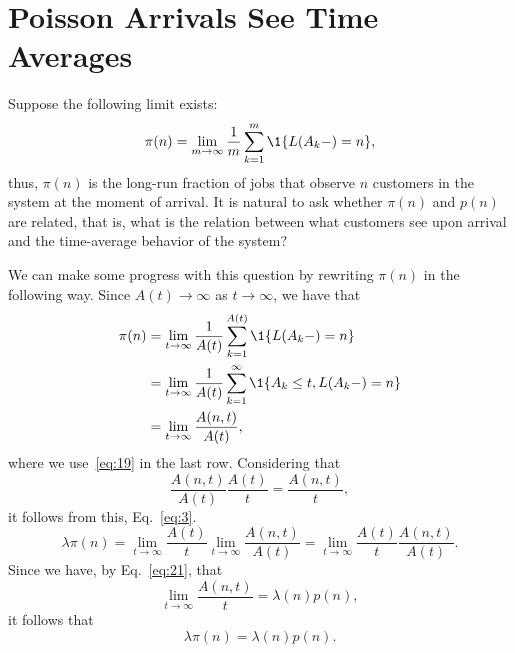 \section{Poisson Arrivals See Time Averages}
\label{sec:poisson-arrivals-see}

Suppose the following limit exists:
\begin{equation*}
  \pi(n) = \lim_{m\to\infty} \frac1m\sum_{k=1}^m \1{L(A_k-) = n},
\end{equation*}
thus,  $\pi(n)$ is the long-run fraction of jobs that observe $n$
customers in the system at the moment of arrival.  It is natural to
ask whether $\pi(n)$ and $p(n)$ are related, that is, what is the
relation between what customers see upon arrival and the time-average
behavior of the system?


We can make some progress with this question by rewriting $\pi(n)$ in
the following way. Since $A(t)\to \infty$ as $t\to\infty$, we have
that
\begin{equation}\label{eq:132}
  \begin{split}
  \pi(n) &= \lim_{t\to\infty} \frac1{A(t)}\sum_{k=1}^{A(t)} \1{L(A_k-) = n} \\
  &= \lim_{t\to\infty} \frac1{A(t)}\sum_{k=1}^\infty \1{A_k \leq t, L(A_k-) = n} \\
  &= \lim_{t\to\infty} \frac{A(n,t)}{A(t)},
  \end{split}
\end{equation}
where we use~\eqref{eq:19} in the last row. Considering that
\begin{equation*}
\frac{A(n,t)}{A(t)}\frac{A(t)}{t} =   \frac{A(n,t)}{t},
\end{equation*}
it follows from this, Eq.~\eqref{eq:3}. 
\begin{equation}\label{eq:1333}
\lambda  \pi(n) 
= \lim_{t\to\infty} \frac{A(t)}t \lim_{t\to\infty} \frac{A(n,t)}{A(t)} 
= \lim_{t\to\infty} \frac{A(t)}t  \frac{A(n,t)}{A(t)}.
\end{equation}
Since we have, by  Eq.~\eqref{eq:21}, that 
\begin{equation*}
\lim_{t\to\infty} \frac{A(n,t)}t = \lambda(n) p(n),
\end{equation*}
it follows that
\begin{equation}\label{eq:13}
\lambda  \pi(n) = \lambda(n) p(n).
\end{equation}

